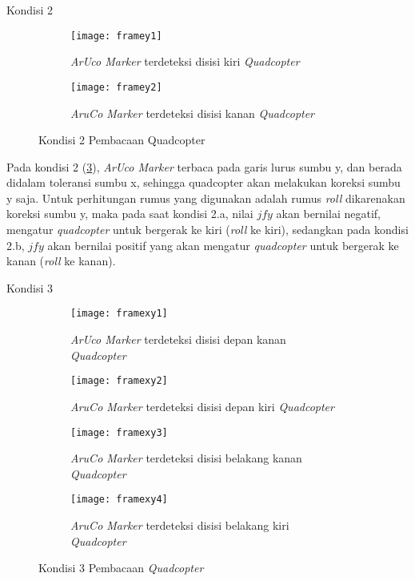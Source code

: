 Kondisi 2

\begin{figure}[H]
	\centering
	\begin{subfigure}[b]{0.4\textwidth}
		\centering
		\texttt{[image: framey1]}
		\caption{\textit{ArUco Marker} terdeteksi disisi kiri \textit{Quadcopter}}
		\label{fig:framey1}
	\end{subfigure}
	\hfill
	\begin{subfigure}[b]{0.4\textwidth}
		\centering
		\texttt{[image: framey2]}
		\caption{\textit{AruCo Marker} terdeteksi disisi kanan \textit{Quadcopter}}
		\label{fig:framey2}
	\end{subfigure}
	\caption{Kondisi 2 Pembacaan Quadcopter}
	\label{fig:kondisi2}
\end{figure}

Pada kondisi 2 (\cref{fig:kondisi2}), \textit{ArUco Marker} terbaca pada garis lurus sumbu y, dan berada didalam toleransi sumbu x, sehingga quadcopter akan melakukan koreksi sumbu y saja.
Untuk perhitungan rumus yang digunakan adalah rumus \textit{roll} dikarenakan koreksi sumbu y, maka pada saat kondisi 2.a, nilai \({jfy}\) akan bernilai negatif, mengatur \textit{quadcopter} untuk bergerak ke kiri (\textit{roll} ke kiri), sedangkan pada kondisi 2.b, \({jfy}\) akan bernilai positif yang akan mengatur \textit{quadcopter} untuk bergerak ke kanan (\textit{roll} ke kanan).

Kondisi 3

\begin{figure}[H]
	\centering
	\begin{subfigure}[b]{0.4\textwidth}
		\centering
		\texttt{[image: framexy1]}
		\caption{\textit{ArUco Marker} terdeteksi disisi depan kanan \textit{Quadcopter}}
		\label{fig:framexy1}
	\end{subfigure}
	\hfill
	\begin{subfigure}[b]{0.4\textwidth}
		\centering
		\texttt{[image: framexy2]}
		\caption{\textit{AruCo Marker} terdeteksi disisi depan kiri \textit{Quadcopter}}
		\label{fig:framexy2}
	\end{subfigure}
	\hfill
	\begin{subfigure}[b]{0.4\textwidth}
		\centering
		\texttt{[image: framexy3]}
		\caption{\textit{AruCo Marker} terdeteksi disisi belakang kanan \textit{Quadcopter}}
		\label{fig:framexy3}
	\end{subfigure}
	\hfill
	\begin{subfigure}[b]{0.4\textwidth}
		\centering
		\texttt{[image: framexy4]}
		\caption{\textit{AruCo Marker} terdeteksi disisi belakang kiri \textit{Quadcopter}}
		\label{fig:framexy4}
	\end{subfigure}
	\caption{Kondisi 3 Pembacaan \textit{Quadcopter}}
	\label{fig:kondisi3}
\end{figure}

